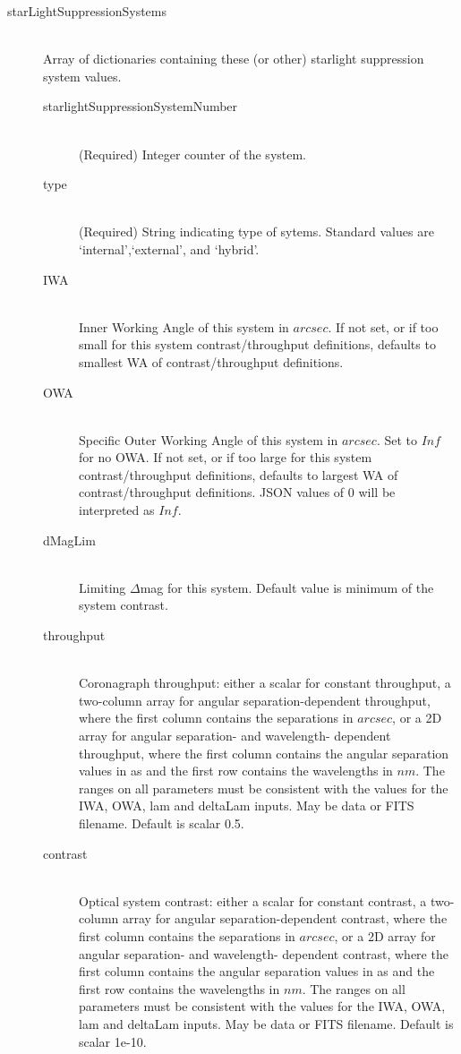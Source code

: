 \documentclass[cleanfoot]{asme2ej}
\begin{document}
\begin{itemize}
\begin{description}
    \item[starLightSuppressionSystems] \hfill\\ Array of dictionaries containing these (or other) starlight suppression system values.
    \begin{description}
    \item[starlightSuppressionSystemNumber] \hfill\\ (Required) Integer counter of the system.
    \item[type] \hfill\\ (Required) String indicating type of sytems.  Standard values are `internal',`external', and `hybrid'.
    \item[IWA] \hfill \\
     Inner Working Angle of this system in $ arcsec $. If not set, or if too small for this system contrast/throughput definitions, defaults to smallest WA of contrast/throughput definitions.
    \item[OWA] \hfill \\
    Specific Outer Working Angle of this system in $ arcsec $. Set to $ Inf $ for no OWA. If not set, or if too large for this system contrast/throughput definitions, defaults to largest WA of contrast/throughput definitions.  JSON values of 0 will be interpreted as $ Inf $.
    \item[dMagLim] \hfill \\
    Limiting $ \Delta$mag for this system. Default value is minimum of the system contrast.
    \item[throughput] \hfill \\
    Coronagraph throughput: either a scalar for constant throughput, a two-column array for angular separation-dependent throughput, where the first column contains the separations in $ arcsec $, or a 2D array for angular separation- and wavelength- dependent throughput, where the first column contains the angular separation values in as and the first row contains the wavelengths in $ nm $.  The ranges on all parameters must be consistent with the values for the IWA, OWA, lam and deltaLam inputs.  May be data or FITS filename. Default is scalar 0.5.
    \item[contrast] \hfill \\
    Optical system contrast: either a scalar for constant contrast, a two-column array for angular separation-dependent contrast, where the first column contains the separations in $ arcsec $, or a 2D array for angular separation- and wavelength- dependent contrast, where the first column contains the angular separation values in as and the first row contains the wavelengths in $ nm $.  The ranges on all parameters must be consistent with the values for the IWA, OWA, lam and deltaLam inputs. May be data or FITS filename. Default is scalar 1e-10.

\end{description}
\end{description}
\end{itemize}
\end{document}
